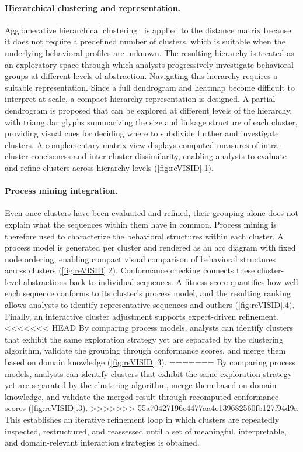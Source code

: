 \paragraph{Hierarchical clustering and representation.}
Agglomerative hierarchical clustering~\cite{hartigan1975clustering} is applied to the distance matrix because it does not require a predefined number of clusters, which is suitable when the underlying behavioral profiles are unknown.
The resulting hierarchy is treated as an exploratory space through which analysts progressively investigate behavioral groups at different levels of abstraction.
Navigating this hierarchy requires a suitable representation.
Since a full dendrogram and heatmap become difficult to interpret at scale, a compact hierarchy representation is designed.
A partial dendrogram is proposed that can be explored at different levels of the hierarchy, with triangular glyphs summarizing the size and linkage structure of each cluster, providing visual cues for deciding where to subdivide further and investigate clusters.
A complementary matrix view displays computed measures of intra-cluster conciseness and inter-cluster dissimilarity, enabling analysts to evaluate and refine clusters across hierarchy levels (\cref{fig:reVISID}.1).


\paragraph{Process mining integration.}
Even once clusters have been evaluated and refined, their grouping alone does not explain what the sequences within them have in common.
Process mining is therefore used to characterize the behavioral structures within each cluster.
A process model is generated per cluster and rendered as an arc diagram with fixed node ordering, enabling compact visual comparison of behavioral structures across clusters (\cref{fig:reVISID}.2).
Conformance checking connects these cluster-level abstractions back to individual sequences.
A fitness score quantifies how well each sequence conforms to its cluster's process model, and the resulting ranking allows analysts to identify representative sequences and outliers (\cref{fig:reVISID}.4).
Finally, an interactive cluster adjustment supports expert-driven refinement.
<<<<<<< HEAD
By comparing process models, analysts can identify clusters that exhibit the same exploration strategy yet are separated by the clustering algorithm, validate the grouping through conformance scores, and merge them based on domain knowledge (\cref{fig:reVISID}.3).
=======
By comparing process models, analysts can identify clusters that exhibit the same exploration strategy yet are separated by the clustering algorithm, merge them based on domain knowledge, and validate the merged result through recomputed conformance scores (\cref{fig:reVISID}.3).
>>>>>>> 55a70427196e4477aa4e139682560fb127f94d9a
This establishes an iterative refinement loop in which clusters are repeatedly inspected, restructured, and reassessed until a set of meaningful, interpretable, and domain-relevant interaction strategies is obtained.


